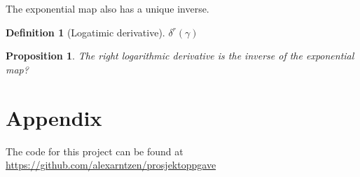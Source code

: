 \documentclass[a4paper]{article}
\newtheorem{definition}{Definition}[section]
\newtheorem{proposition}[theorem]{Proposition}
\begin{document}
The exponential map also has a unique inverse. 
\begin{definition}[Logatimic derivative]
  $\delta^r(\gamma)$
\end{definition}
\begin{proposition}
  The right logarithmic derivative is the inverse of the exponential map?  
\end{proposition}

\section*{Appendix}
The code for this project can be found at \url{https://github.com/alexarntzen/prosjektoppgave}


\printbibliography
\end{document}
